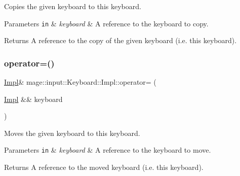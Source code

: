 Copies the given keyboard to this keyboard.


\begin{DoxyParams}[1]{Parameters}
\mbox{\tt in}  & {\em keyboard} & A reference to the keyboard to copy. \\
\hline
\end{DoxyParams}
\begin{DoxyReturn}{Returns}
A reference to the copy of the given keyboard (i.\+e. this keyboard). 
\end{DoxyReturn}
\mbox{\label{classmage_1_1input_1_1_keyboard_1_1_impl_adb53a165dcaf0e28ea51a64f40dcd482}} 
\subsubsection{\texorpdfstring{operator=()}{operator=()}\hspace{0.1cm}{\footnotesize\ttfamily [2/2]}}
{\footnotesize\ttfamily \mbox{\hyperlink{classmage_1_1input_1_1_keyboard_1_1_impl}{Impl}}\& mage\+::input\+::\+Keyboard\+::\+Impl\+::operator= (\begin{DoxyParamCaption}\item[{\mbox{\hyperlink{classmage_1_1input_1_1_keyboard_1_1_impl}{Impl}} \&\&}]{keyboard }\end{DoxyParamCaption})\hspace{0.3cm}{\ttfamily [delete]}}

Moves the given keyboard to this keyboard.


\begin{DoxyParams}[1]{Parameters}
\mbox{\tt in}  & {\em keyboard} & A reference to the keyboard to move. \\
\hline
\end{DoxyParams}
\begin{DoxyReturn}{Returns}
A reference to the moved keyboard (i.\+e. this keyboard). 
\end{DoxyReturn}
\mbox{\label{classmage_1_1input_1_1_keyboard_1_1_impl_a94276b53e2160e2d191c405f858a76ba}} 

